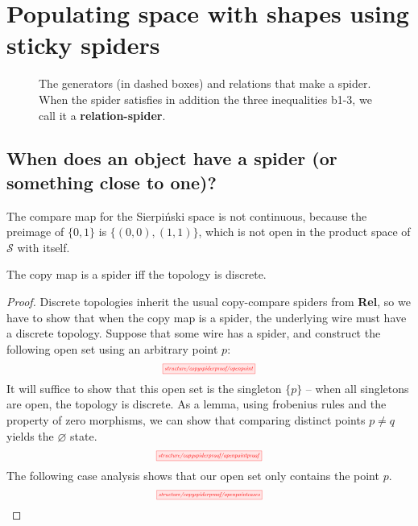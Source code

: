 \section{Populating space with shapes using sticky spiders}\label{sec:stickyspider}

\begin{figure}\label{fig:spiderbicate}
\caption{The generators (in dashed boxes) and relations that make a spider. When the spider satisfies in addition the three inequalities b1-3, we call it a \textbf{relation-spider}.}
\end{figure}

\subsection{When does an object have a spider (or something close to one)?}


\begin{example}\label{ex:compnotspider}
The compare map for the Sierpi\'{n}ski space is not continuous, because the preimage of $\{0,1\}$ is $\{(0,0),(1,1)\}$, which is not open in the product space of $\mathcal{S}$ with itself.
\end{example}

\begin{proposition}\label{prop:copydiscrete}
The copy map is a spider iff the topology is discrete.
\begin{proof}
Discrete topologies inherit the usual copy-compare spiders from \textbf{Rel}, so we have to show that when the copy map is a spider, the underlying wire must have a discrete topology. Suppose that some wire has a spider, and construct the following open set using an arbitrary point $p$:
\[\scalebox{0.5}{\tikzfig{structure/copyspiderproof/openpoint}}\]
It will suffice to show that this open set is the singleton $\{p\}$ -- when all singletons are open, the topology is discrete. As a lemma, using frobenius rules and the property of zero morphisms, we can show that comparing distinct points $p \neq q$ yields the $\varnothing$ state.
\[\scalebox{0.5}{\tikzfig{structure/copyspiderproof/openpointproof}}\]
The following case analysis shows that our open set only contains the point $p$.
\[\scalebox{0.5}{\tikzfig{structure/copyspiderproof/openpointcases}}\]
\end{proof}
\end{proposition}

